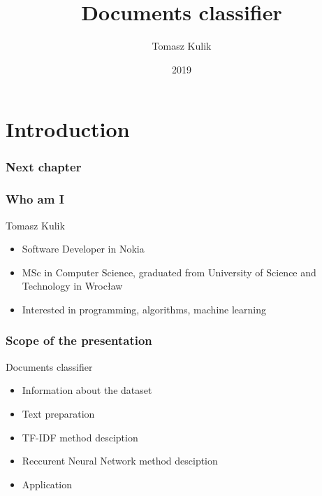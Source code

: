 \documentclass{beamer}
\title[]
{Documents classifier}
\author[] {Tomasz Kulik}
\date[2019]
{2019}
\begin{document}
    \begin{frame}
        \titlepage
    \end{frame}


    \section{Introduction}
    \begin{frame}
    	\frametitle{Next chapter}
        \tableofcontents[currentsection]
    \end{frame}
    \begin{frame}
        \frametitle{Who am I}
        \begin{center}
            Tomasz Kulik
        \end{center}
        \begin{itemize}
            \item Software Developer in Nokia
            \item MSc in Computer Science, graduated from University of Science and Technology in Wrocław
            \item Interested in programming, algorithms, machine learning
        \end{itemize}
    \end{frame}
    \begin{frame}
        \frametitle{Scope of the presentation}
        Documents classifier
        \begin{itemize}
            \item Information about the dataset
            \item Text preparation
            \item TF-IDF method desciption
            \item Reccurent Neural Network method desciption
            \item Application
        \end{itemize}
    \end{frame}
\end{document}
